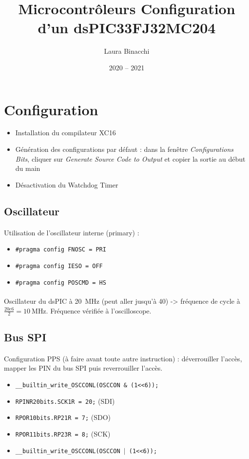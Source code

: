 \documentclass{article}
\title{Microcontrôleurs\bigbreak \bigbreak
    \large Configuration d'un dsPIC33FJ32MC204}
\date{2020 -- 2021}
\author{Laura Binacchi}
\begin{document}

    \section{Configuration}
    \begin{itemize}
        \item Installation du compilateur XC16
        \item Génération des configurations par défaut : dans la fenêtre \emph{Configurations Bits}, cliquer sur \emph{Generate Source Code to Output} et copier la sortie au début du main
        \item Désactivation du Watchdog Timer
    \end{itemize}


        \subsection{Oscillateur}
        \paragraph{}
        Utilisation de l'oscillateur interne (primary) :
        \begin{itemize}
            \item \texttt{\#pragma config FNOSC = PRI}
            \item \texttt{\#pragma config IESO = OFF}
            \item \texttt{\#pragma config POSCMD = HS}
        \end{itemize}
        \paragraph{}
        Oscillateur du dsPIC à \SI{20}{\mega\hertz} (peut aller jusqu'à 40) -> fréquence de cycle à $\frac{20e6}{2} = \SI{10}{\mega\hertz}$. Fréquence vérifiée à l'oscilloscope.


        \subsection{Bus SPI}
        \paragraph{}
        Configuration PPS (à faire avant toute autre instruction) : déverrouiller l'accès, mapper les PIN du bus SPI puis reverrouiller l'accès.
        \begin{itemize}
            \item \texttt{\_\_builtin\_write\_OSCCONL(OSCCON \& \texttildelow(1<<6));}
            \item \texttt{RPINR20bits.SCK1R = 20;} (SDI)
            \item \texttt{RPOR10bits.RP21R = 7;} (SDO)
            \item \texttt{RPOR11bits.RP23R = 8;} (SCK)
            \item \texttt{\_\_builtin\_write\_OSCCONL(OSCCON $|$ (1<<6));}
        \end{itemize}
\end{document}
